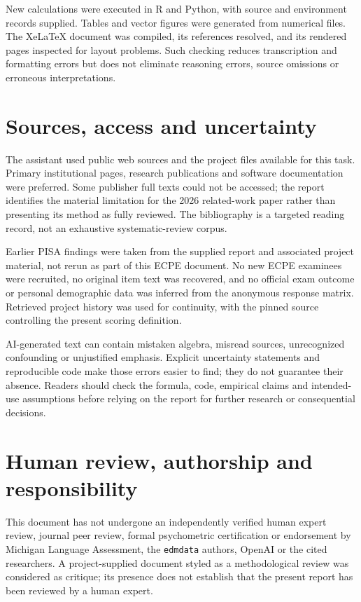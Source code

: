 \documentclass[11pt,a4paper,oneside,headings=normal,parskip=half]{scrreprt}
\newcommand{\code}[1]{\nolinkurl{#1}}
\begin{document}
New calculations were executed in R and Python, with source and environment records supplied. Tables and vector figures were generated from numerical files. The XeLaTeX document was compiled, its references resolved, and its rendered pages inspected for layout problems. Such checking reduces transcription and formatting errors but does not eliminate reasoning errors, source omissions or erroneous interpretations.

\section{Sources, access and uncertainty}
The assistant used public web sources and the project files available for this task. Primary institutional pages, research publications and software documentation were preferred. Some publisher full texts could not be accessed; the report identifies the material limitation for the 2026 related-work paper rather than presenting its method as fully reviewed. The bibliography is a targeted reading record, not an exhaustive systematic-review corpus.

Earlier PISA findings were taken from the supplied report and associated project material, not rerun as part of this ECPE document. No new ECPE examinees were recruited, no original item text was recovered, and no official exam outcome or personal demographic data was inferred from the anonymous response matrix. Retrieved project history was used for continuity, with the pinned source controlling the present scoring definition.

AI-generated text can contain mistaken algebra, misread sources, unrecognized confounding or unjustified emphasis. Explicit uncertainty statements and reproducible code make those errors easier to find; they do not guarantee their absence. Readers should check the formula, code, empirical claims and intended-use assumptions before relying on the report for further research or consequential decisions.

\section{Human review, authorship and responsibility}
This document has not undergone an independently verified human expert review, journal peer review, formal psychometric certification or endorsement by Michigan Language Assessment, the \code{edmdata} authors, OpenAI or the cited researchers. A project-supplied document styled as a methodological review was considered as critique; its presence does not establish that the present report has been reviewed by a human expert.
\end{document}

